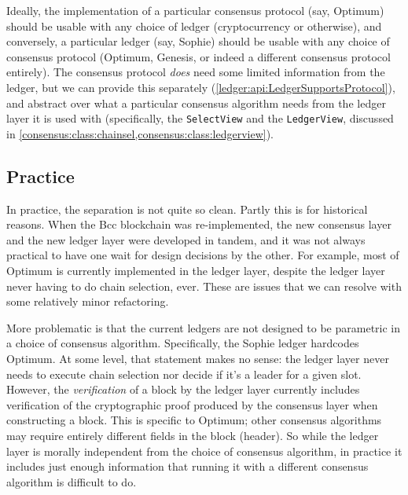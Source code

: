 Ideally, the implementation of a particular consensus protocol (say, Optimum)
should be usable with any choice of ledger (cryptocurrency or otherwise), and
conversely, a particular ledger (say, Sophie) should be usable with any choice
of consensus protocol  (Optimum, Genesis, or indeed a different consensus protocol
entirely). The consensus protocol \emph{does} need some limited information from
the ledger, but we can provide this separately
(\cref{ledger:api:LedgerSupportsProtocol}), and abstract over what a particular
consensus algorithm needs from the ledger layer it is used with (specifically,
the \lstinline!SelectView! and the \lstinline!LedgerView!, discussed in
\cref{consensus:class:chainsel,consensus:class:ledgerview}).

\subsection{Practice}

In practice, the separation is not quite so clean. Partly this is for
historical reasons. When the Bcc blockchain was re-implemented, the new
consensus layer and the new ledger layer were developed in tandem, and it was
not always practical to have one wait for design decisions by the other.
For example, most of Optimum is currently implemented in the ledger layer,
despite the ledger layer never having to do chain selection, ever. These are
issues that we can resolve with some relatively minor refactoring.

More problematic is that the current ledgers are not designed to be parametric
in a choice of consensus algorithm. Specifically, the Sophie ledger hardcodes
Optimum. At some level, that statement makes no sense: the ledger layer never
needs to execute chain selection nor decide if it's a leader for a given slot.
However, the \emph{verification} of a block by the ledger layer currently
includes verification of the cryptographic proof produced by the consensus layer
when constructing a block. This is specific to Optimum; other consensus algorithms
may require entirely different fields in the block (header). So while the ledger
layer is morally independent from the choice of consensus algorithm, in practice
it includes just enough information that running it with a different consensus
algorithm is difficult to do.

